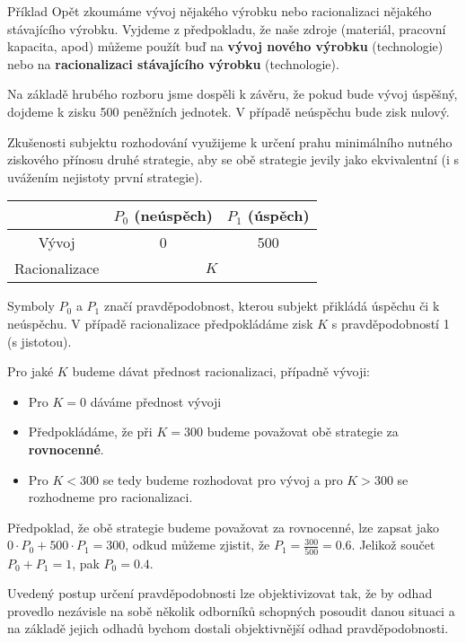 	\begin{note}{Příklad}
	Opět zkoumáme vývoj nějakého výrobku nebo racionalizaci nějakého stávajícího výrobku. Vyjdeme z předpokladu, že naše zdroje (materiál, pracovní kapacita, apod) můžeme použít buď na \textbf{vývoj nového výrobku} (technologie) nebo na \textbf{racionalizaci stávajícího výrobku} (technologie).\br

	Na základě hrubého rozboru jsme dospěli k závěru, že pokud bude vývoj úspěšný, dojdeme k zisku 500 peněžních jednotek. V případě neúspěchu bude zisk nulový.\br

	Zkušenosti subjektu rozhodování využijeme k určení prahu minimálního nutného ziskového přínosu druhé strategie, aby se obě strategie jevily jako ekvivalentní (i s uvážením nejistoty první strategie).

	\begin{table}[H]
	\centering
	\def\arraystretch{1.25}
	\begin{tabular}{|c|c|c|}
	\hline
	& $P_0$ (neúspěch) & $P_1$ (úspěch)\\\hline
	Vývoj & 0 & 500\\\hline
	Racionalizace & \multicolumn{2}{|c|}{$K$}\\\hline
	\end{tabular}
	\end{table}

	Symboly $P_0$ a $P_1$ značí pravděpodobnost, kterou subjekt přikládá úspěchu či k neúspěchu. V případě racionalizace předpokládáme zisk $K$ s pravděpodobností 1 (s jistotou).\br

	Pro jaké $K$ budeme dávat přednost racionalizaci, případně vývoji:
	\begin{itemize}[noitemsep]
		\item Pro $K=0$ dáváme přednost vývoji
		\item Předpokládáme, že při $K=300$ budeme považovat obě strategie za \textbf{rovnocenné}.
		\item Pro $K < 300$ se tedy budeme rozhodovat pro vývoj a pro $K>300$ se rozhodneme pro racionalizaci.
	\end{itemize}

	Předpoklad, že obě strategie budeme považovat za rovnocenné, lze zapsat jako $0\cdot P_0 + 500\cdot P_1=300$, odkud můžeme zjistit, že $P_1 = \frac{300}{500} = 0.6$. Jelikož součet $P_0+P_1=1$, pak $P_0=0.4$.\br

	Uvedený postup určení pravděpodobnosti lze objektivizovat tak, že by odhad provedlo nezávisle na sobě několik odborníků schopných posoudit danou situaci a na základě jejich odhadů bychom dostali objektivnější odhad pravděpodobnosti.
	\end{note}

